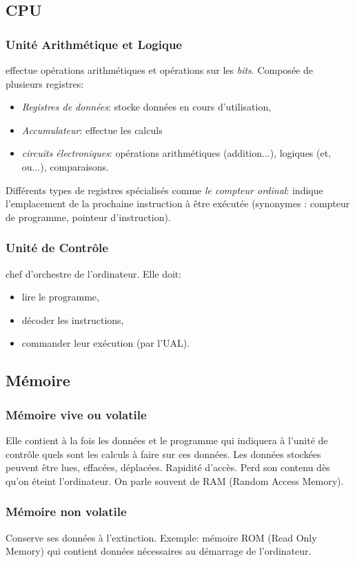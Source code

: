 \documentclass[a4paper,11pt]{article}
\begin{document}
\begin{Form}
\subsection{CPU}
\subsubsection{Unité Arithmétique et Logique}
effectue opérations arithmétiques et opérations sur les \emph{bits}. Composée de plusieurs registres:
\begin{itemize}
\item \emph{Registres de données}: stocke données en cours d'utilisation,
\item \emph{Accumulateur}: effectue les calculs
\item \emph{circuits électroniques}: opérations arithmétiques (addition...), logiques (et, ou...), comparaisons.
\end{itemize}
Différents types de registres spécialisés comme \emph{le compteur ordinal}: indique l'emplacement de la prochaine instruction à être exécutée (synonymes : compteur de programme, pointeur d'instruction).
\subsubsection{Unité de Contrôle}
chef d'orchestre de l'ordinateur. Elle doit:
\begin{itemize}
\item lire le programme,
\item décoder les instructions,
\item commander leur exécution (par l'UAL).
\end{itemize} 
\subsection{Mémoire}
\subsubsection{Mémoire vive ou volatile}
Elle contient à la fois les données et le programme qui indiquera à l’unité de contrôle quels sont les calculs à faire sur ces données. Les données stockées peuvent être lues, effacées, déplacées. Rapidité d'accès. Perd son contenu dès qu'on éteint l'ordinateur. On parle souvent de RAM (Random Access Memory).
\subsubsection{Mémoire non volatile}
Conserve ses données à l'extinction. Exemple: mémoire ROM (Read Only Memory) qui contient données nécessaires au démarrage de l'ordinateur.

\end{Form}
\end{document}
